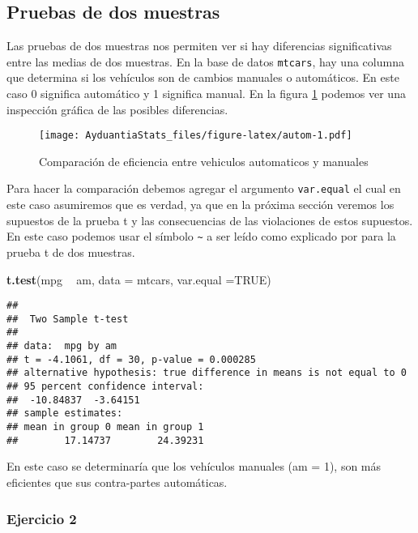 \documentclass[]{book}
\newenvironment{Shaded}{\begin{snugshade}}{\end{snugshade}}
\newcommand{\KeywordTok}[1]{\textcolor[rgb]{0.13,0.29,0.53}{\textbf{#1}}}
\newcommand{\DataTypeTok}[1]{\textcolor[rgb]{0.13,0.29,0.53}{#1}}
\newcommand{\StringTok}[1]{\textcolor[rgb]{0.31,0.60,0.02}{#1}}
\newcommand{\OtherTok}[1]{\textcolor[rgb]{0.56,0.35,0.01}{#1}}
\newcommand{\OperatorTok}[1]{\textcolor[rgb]{0.81,0.36,0.00}{\textbf{#1}}}
\newcommand{\NormalTok}[1]{#1}
\begin{document}
\subsection{Pruebas de dos muestras}\label{pruebas-de-dos-muestras}

Las pruebas de dos muestras nos permiten ver si hay diferencias
significativas entre las medias de dos muestras. En la base de datos
\texttt{mtcars}, hay una columna que determina si los vehículos son de
cambios manuales o automáticos. En este caso 0 significa automático y 1
significa manual. En la figura \ref{fig:autom} podemos ver una
inspección gráfica de las posibles diferencias.

\begin{figure}
\centering
\texttt{[image: AyduantiaStats\_files/figure-latex/autom-1.pdf]}
\caption{\label{fig:autom}Comparación de eficiencia entre vehiculos
automaticos y manuales}
\end{figure}

Para hacer la comparación debemos agregar el argumento
\texttt{var.equal} el cual en este caso asumiremos que es verdad, ya que
en la próxima sección veremos los supuestos de la prueba t y las
consecuencias de las violaciones de estos supuestos. En este caso
podemos usar el símbolo \texttt{\textasciitilde{}} a ser leído como
explicado por para la prueba t de dos muestras.

\begin{Shaded}
\begin{Highlighting}[]
\KeywordTok{t.test}\NormalTok{(mpg }\OperatorTok{~}\StringTok{ }\NormalTok{am, }\DataTypeTok{data =}\NormalTok{ mtcars, }\DataTypeTok{var.equal =}\OtherTok{TRUE}\NormalTok{)}
\end{Highlighting}
\end{Shaded}

\begin{verbatim}
## 
##  Two Sample t-test
## 
## data:  mpg by am
## t = -4.1061, df = 30, p-value = 0.000285
## alternative hypothesis: true difference in means is not equal to 0
## 95 percent confidence interval:
##  -10.84837  -3.64151
## sample estimates:
## mean in group 0 mean in group 1 
##        17.14737        24.39231
\end{verbatim}

En este caso se determinaría que los vehículos manuales (am = 1), son
más eficientes que sus contra-partes automáticas.

\subsubsection{Ejercicio 2}\label{ejercicio-2}
\end{document}
